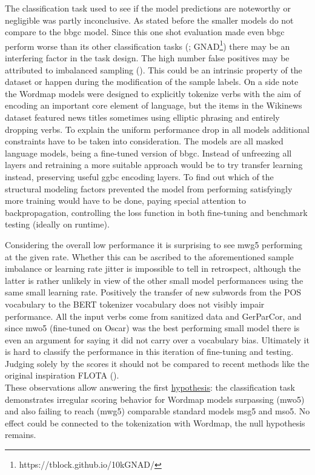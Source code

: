 The classification task used to see if the model predictions are noteworthy or negligible was partly inconclusive.
As stated before the smaller models do not compare to the bbgc model.
Since this one shot evaluation made even bbgc perform worse than its other classification tasks (\textcite{germeval}; GNAD\footnote{https://tblock.github.io/10kGNAD/}) there may be an interfering factor in the task design.
The high number false positives may be attributed to imbalanced sampling (\cite[5--6]{brownlee2020imbalanced}).
This could be an intrinsic property of the dataset or happen during the modification of the sample labels.
On a side note the Wordmap models were designed to explicitly tokenize verbs with the aim of encoding an important core element of language, but the items in the Wikinews dataset featured news titles sometimes using elliptic phrasing and entirely dropping verbs.
To explain the uniform performance drop in all models additional constraints have to be taken into consideration.
The models are all masked language models, being a fine-tuned version of bbgc.
Instead of unfreezing all layers and retraining a more suitable approach would be to try transfer learning instead, preserving useful ggbc encoding layers.
To find out which of the structural modeling factors prevented the model from performing satisfyingly more training would have to be done, paying special attention to backpropagation, controlling the loss function in both fine-tuning and benchmark testing (ideally on runtime).

Considering the overall low performance it is surprising to see mwg5 performing at the given rate.
Whether this can be ascribed to the aforementioned sample imbalance or learning rate jitter is impossible to tell in retrospect, although the latter is rather unlikely in view of the other small model performances using the same small learning rate.
Positively the transfer of new subwords from the POS vocabulary to the BERT tokenizer vocabulary does not visibly impair performance.
All the input verbs come from sanitized data and GerParCor, and since mwo5 (fine-tuned on Oscar) was the best performing small model there is even an argument for saying it did not carry over a vocabulary bias.
Ultimately it is hard to classify the performance in this iteration of fine-tuning and testing.
Judging solely by the scores it should not be compared to recent methods like the original inspiration FLOTA (\cite{FLOTA}).\\
These observations allow answering the first \hyperlink{hyp1}{hypothesis}: the classification task demonstrates irregular scoring behavior for Wordmap models surpassing (mwo5) and also failing to reach (mwg5) comparable standard models msg5 and mso5.
No effect could be connected to the tokenization with Wordmap, the null hypothesis remains.


